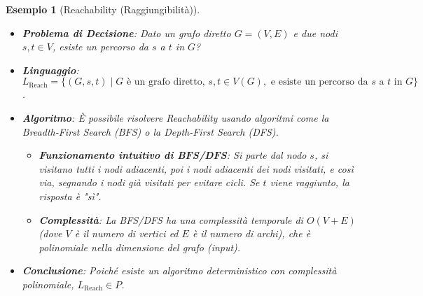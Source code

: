 \documentclass[a4paper, 11pt]{book} %
\newtheorem{example}[theorem]{Esempio}
\theoremstyle{definition}
\begin{document}
\begin{example}[Reachability (Raggiungibilità)]
\begin{itemize}
    \item \textbf{Problema di Decisione}: Dato un grafo diretto $G=(V, E)$ e due nodi $s, t \in V$, esiste un percorso da $s$ a $t$ in $G$?
    \item \textbf{Linguaggio}: $L_{\text{Reach}} = \{ (G, s, t) \mid G \text{ è un grafo diretto, } s, t \in V(G), \text{ e esiste un percorso da } s \text{ a } t \text{ in } G \}$.
    \item \textbf{Algoritmo}: È possibile risolvere Reachability usando algoritmi come la Breadth-First Search (BFS) o la Depth-First Search (DFS).
        \begin{itemize}
            \item \textbf{Funzionamento intuitivo di BFS/DFS}: Si parte dal nodo $s$, si visitano tutti i nodi adiacenti, poi i nodi adiacenti dei nodi visitati, e così via, segnando i nodi già visitati per evitare cicli. Se $t$ viene raggiunto, la risposta è "sì".
            \item \textbf{Complessità}: La BFS/DFS ha una complessità temporale di $O(V+E)$ (dove $V$ è il numero di vertici ed $E$ è il numero di archi), che è polinomiale nella dimensione del grafo (input).
        \end{itemize}
    \item \textbf{Conclusione}: Poiché esiste un algoritmo deterministico con complessità polinomiale, $L_{\text{Reach}} \in P$.
\end{itemize}
\end{example}
\end{document}
